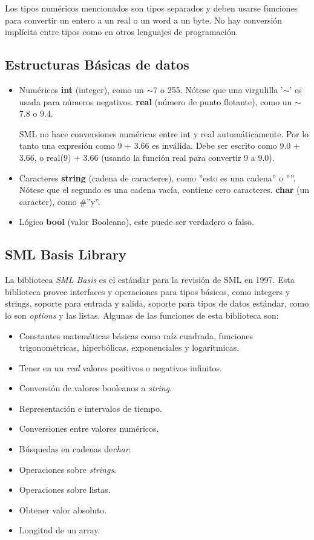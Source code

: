 \documentclass[10pt,journal,compsoc]{IEEEtran}
\begin{document}
Los tipos num\'ericos mencionados son tipos separados y deben usarse funciones para convertir un entero a un real o un word a un byte. No hay conversi\'on impl\'icita entre tipos como en otros lenguajes de programaci\'on.

\subsection{Estructuras B\'asicas de datos}
\begin{itemize}
	\item Num\'ericos
		\subitem \textbf{int} (integer), como un $\sim$7 o 255. N\'otese que una virgulilla '$\sim$' es usada para n\'umeros negativos.
		\subitem \textbf{real} (n\'umero de punto flotante), como un $\sim$7.8 o 9.4. 
		
		\subitem SML no hace conversiones num\'ericas entre int y real autom\'aticamente. Por lo tanto una expresi\'on como 9 + 3.66 es inv\'alida. Debe ser escrito como 9.0 + 3.66, o real(9) + 3.66 (usando la funci\'on real para convertir 9 a 9.0).
		
	\item Caracteres
		\subitem \textbf{string} (cadena de caracteres), como ''esto es una cadena'' o ''''. N\'otese que el segundo es una cadena vac\'ia, contiene cero caracteres.
		\subitem \textbf{char} (un caracter), como \#''y''.
	
	\item L\'ogico
		\subitem \textbf{bool} (valor Booleano), este puede ser verdadero o falso.
\end{itemize}		
\subsection{SML Basis Library}
La biblioteca \textit{SML Basis} es el est\'andar para la revisi\'on de SML en 1997. Esta biblioteca provee interfaces y operaciones para tipos b\'asicos, como integers y strings, soporte para entrada y salida, soporte para tipos de datos est\'andar, como lo son \textit{options} y las listas. Algunas de las funciones de esta biblioteca son:
\begin{itemize}
	\item Constantes matem\'aticas b\'asicas como ra\'iz cuadrada, funciones trigonom\'etricas, hiperb\'olicas, exponenciales y logar\'itmicas.
	\item Tener en un \textit{real} valores positivos o negativos infinitos.
	\item Conversi\'on de valores booleanos a \textit{string}.
	\item Representaci\'on e intervalos de tiempo.
	\item Conversiones entre valores num\'ericos.
	\item B\'usquedas en cadenas de\textit{char}.
	\item Operaciones sobre \textit{strings}.
	\item Operaciones sobre listas.
	\item Obtener valor absoluto.
	\item Longitud de un array.
\end{itemize}
\end{document}
